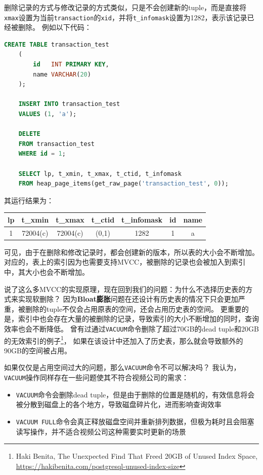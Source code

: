 \documentclass[a4paper,10pt]{ctexart}
\begin{document}
删除记录的方式与修改记录的方式类似，只是不会创建新的tuple，而是直接将\texttt{xmax}设置为当前\texttt{transaction}的\texttt{xid}，并将\texttt{t\_infomask}设置为1282，表示该记录已经被删除。
例如以下代码：
\begin{lstlisting}[language=SQL]
    CREATE TABLE transaction_test
    (
        id   INT PRIMARY KEY,
        name VARCHAR(20)
    );

    INSERT INTO transaction_test
    VALUES (1, 'a');

    DELETE
    FROM transaction_test
    WHERE id = 1;

    SELECT lp, t_xmin, t_xmax, t_ctid, t_infomask
    FROM heap_page_items(get_raw_page('transaction_test', 0));
\end{lstlisting}

其运行结果为：
\begin{center}
    \begin{tabular}{ccccccc}
        \toprule
        lp & t\_xmin & t\_xmax & t\_ctid & t\_infomask & id & name \\
        \midrule
        1 & 72004(c) & 72004(c) & (0,1) & 1282 & 1 & a \\
        \bottomrule
    \end{tabular}
\end{center}

可见，由于在删除和修改记录时，都会创建新的版本，所以表的大小会不断增加。
对应的，表上的索引因为也需要支持MVCC，被删除的记录也会被加入到索引中，其大小也会不断增加。

\vspace{0.7cm}

说了这么多MVCC的实现原理，现在回到我们的问题：为什么不选择历史表的方式来实现软删除？
因为\textbf{Bloat膨胀}问题在还设计有历史表的情况下只会更加严重，被删除的tuple不仅会占用原表的空间，还会占用历史表的空间。
更重要的是，索引中也会存在大量的被删除的记录，导致索引的大小不断增加的同时，查询效率也会不断降低。
曾有过通过\texttt{VACUUM}命令删除了超过70GB的dead tuple和20GB的无效索引的例子\footnote{Haki Benita, The Unexpected Find That Freed 20GB of Unused Index Space, \url{https://hakibenita.com/postgresql-unused-index-size}}，
如果在该设计中还加入了历史表，那么就会导致额外的90GB的空间被占用。

\vspace{0.7cm}
如果仅仅是占用空间过大的问题，那么\texttt{VACUUM}命令不可以解决吗？
我认为，\texttt{VACUUM}操作同样存在一些问题使其不符合视频公司的需求：
\begin{itemize}
    \item \texttt{VACUUM}命令会删除dead tuple，但是由于删除的位置是随机的，有效信息将会被分散到磁盘上的各个地方，导致磁盘碎片化，进而影响查询效率
    \item \texttt{VACUUM FULL}命令会真正释放磁盘空间并重新排列数据，但极为耗时且会阻塞读写操作，并不适合视频公司这种需要实时更新的场景
\end{itemize}
\end{document}
